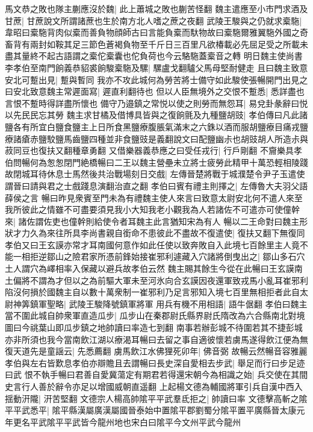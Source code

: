馬文恭之敗也隊主蒯應沒於魏|{
	此上蕭城之敗也蒯苦怪翻}
魏主遣應至小市門求酒及甘蔗|{
	甘蔗說文所謂諸蔗也生於南方北人嗜之蔗之夜翻}
武陵王駿與之仍就求槖駞|{
	韋昭曰槖駞背肉似槖而善負物顔師古曰言能負槖而馱物故曰槖駞爾雅翼駞外國之奇畜背有兩封如鞍其足三節色蒼褐負物至千斤日三百里凡欲椿載必先屈足受之所載未盡其量終不起古語謂之槖佗槖囊也佗負荷也今云駱駞蓋槖音之轉}
明日魏主使尚書李孝伯至南門餉義恭貂裘餉駿槖駞及騾|{
	騾盧戈翻驢父馬母堅耐健走}
且曰魏主致意安北可蹔出見|{
	蹔與暫同}
我亦不攻此城何為勞苦將士備守如此駿使張暢開門出見之曰安北致意魏主常遲面寫|{
	遲直利翻待也}
但以人臣無境外之交恨不蹔悉|{
	悉詳盡也言恨不蹔時得詳盡所懷也}
備守乃邉鎮之常悦以使之則勞而無怨耳|{
	易兌卦彖辭曰悦以先民民忘其勞}
魏主求甘橘及借博具皆與之復餉氈及九種鹽胡豉|{
	孝伯傳曰凡此諸鹽各有所宜白鹽食鹽主上日所食黑鹽療腹脹氣滿末之六銖以酒而服胡鹽療目痛戎鹽療諸瘡赤鹽駮鹽馬齒鹽四種並非食鹽豉是義翻說文曰配鹽幽尗也胡豉胡人所造尗與菽同豆也復扶又翻種章勇翻}
又借樂器義恭應之曰受任戎行|{
	行戶剛翻}
不齎樂具孝伯問暢何為怱怱閉門絶橋暢曰二王以魏主營壘未立將士疲勞此精甲十萬恐輕相陵踐故閉城耳待休息士馬然後共治戰場刻日交戲|{
	左傳晉楚將戰于城濮楚令尹子玉遣使謂晉曰請與君之士戲踐息演翻治直之翻}
孝伯曰賓有禮主則擇之|{
	左傳魯大夫羽父語薛侯之言}
暢曰昨見衆賓至門未為有禮魏主使人來言曰致意太尉安北何不遣人來至我所彼此之情雖不可盡要須見我小大知我老小觀我為人若諸佐不可遣亦可使僮幹來|{
	諸佐謂佐吏也僮幹則給使令者耳魏主此言猶知宋為有人}
暢以二王命對曰魏主形狀才力久為來往所具李尚書親自銜命不患彼此不盡故不復遣使|{
	復扶又翻下無復同}
孝伯又曰王玄謨亦常才耳南國何意作如此任使以致奔敗自入此境七百餘里主人竟不能一相拒逆鄒山之險君家所憑前鋒始接崔邪利遽藏入穴諸將倒曳出之|{
	鄒山多石穴土人謂穴為嶧相率入保藏以避兵故孝伯云然}
魏主賜其餘生今從在此暢曰王玄謨南土偏將不謂為才但以之為前驅大軍未至河氷向合玄謨因夜還軍致戎馬小亂耳崔邪利陷沒何損於國魏主自以數十萬衆制一崔邪利乃足言邪知入境七百里無相拒者此自太尉神筭鎮軍聖略|{
	武陵王駿降號鎮軍將軍}
用兵有機不用相語|{
	語牛倨翻}
孝伯曰魏主當不圍此城自帥衆軍直造瓜步|{
	瓜步山在秦郡尉氏縣界尉氏隋改為六合縣南北對境圖曰今祧葉山即瓜步鎮之地帥讀曰率造七到翻}
南事若辦彭城不待圍若其不捷彭城亦非所須也我今當南飲江湖以療渴耳暢曰去留之事自適彼懷若虜馬遂得飲江便為無復天道先是童謡云|{
	先悉薦翻}
虜馬飲江水佛狸死卯年|{
	佛音弼}
故暢云然暢音容雅麗孝伯與左右皆歎息孝伯亦辯贍且去謂暢曰長史深自愛相去步武|{
	舉足而行曰步足迹曰武}
恨不執手暢曰君善自愛冀蕩定有期君若得還宋朝今為相識之始|{
	兵交使在其間史言行人善於辭令亦足以增國威朝直遥翻}
上起楊文德為輔國將軍引兵自漢中西入揺動汧隴|{
	汧苦堅翻}
文德宗人楊高帥隂平平武羣氐拒之|{
	帥讀曰率}
文德擊高斬之隂平平武悉平|{
	隂平縣漢屬廣漢屬國晉泰始中置隂平郡劉蜀分隂平置平廣縣晉太康元年更名平武隂平平武皆今龍州地也宋白曰隂平今文州平武今龍州}
